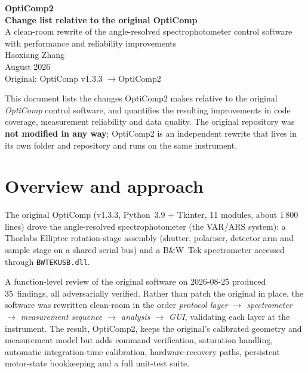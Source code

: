 \documentclass[11pt]{article}
\newcommand{\code}[1]{\texttt{\small #1}}
\begin{document}
\thispagestyle{empty}
\vspace*{2.2cm}
\begin{center}
{\Huge\bfseries\color{accent} OptiComp2}\\[6pt]
{\LARGE\bfseries Change list relative to the original OptiComp}\\[16pt]
{\large A clean-room rewrite of the angle-resolved spectrophotometer control software}\\[10pt]
{\large with performance and reliability improvements}\\[26pt]
{\large Haoxiang Zhang}\\[6pt]
{\normalsize August 2026}\\[4pt]
{\normalsize Original: OptiComp v1.3.3 \quad$\rightarrow$\quad OptiComp2}
\end{center}
\vfill
\noindent\small
This document lists the changes OptiComp2 makes relative to the original \emph{OptiComp} control
software, and quantifies the resulting improvements in code coverage, measurement reliability and
data quality. The original repository was \textbf{not modified in any way}; OptiComp2 is an
independent rewrite that lives in its own folder and repository and runs on the same instrument.
\newpage

\tableofcontents
\newpage

\section{Overview and approach}

The original OptiComp (v1.3.3, Python~3.9 + Tkinter, 11 modules, about 1\,800 lines) drove the
angle-resolved spectrophotometer (the VAR/ARS system): a Thorlabs Elliptec rotation-stage assembly
(shutter, polariser, detector arm and sample stage on a shared serial bus) and a B\&W~Tek
spectrometer accessed through \code{BWTEKUSB.dll}.

A function-level review of the original software on 2026-08-25 produced 35~findings, all
adversarially verified. Rather than patch the original in place, the software was rewritten
clean-room in the order \emph{protocol layer $\rightarrow$ spectrometer $\rightarrow$ measurement
sequence $\rightarrow$ analysis $\rightarrow$ GUI}, validating each layer at the instrument. The
result, OptiComp2, keeps the original's calibrated geometry and measurement model but adds command
verification, saturation handling, automatic integration-time calibration, hardware-recovery paths,
persistent motor-state bookkeeping and a full unit-test suite.
\end{document}
